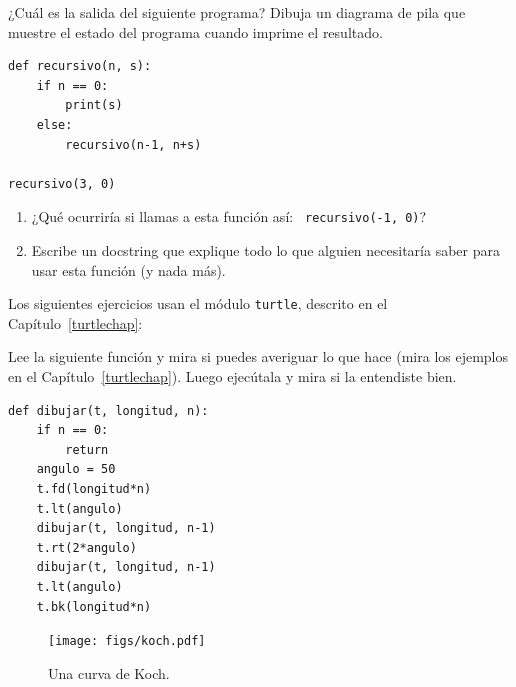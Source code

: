 \documentclass[10pt]{book}
\begin{document}
\begin{exercise}
¿Cuál es la salida del siguiente programa?
Dibuja un diagrama de pila que muestre el estado del programa
cuando imprime el resultado.

\begin{verbatim}
def recursivo(n, s):
    if n == 0:
        print(s)
    else:
        recursivo(n-1, n+s)

recursivo(3, 0)
\end{verbatim}

\begin{enumerate}

\item ¿Qué ocurriría si llamas a esta función así: {\tt
  recursivo(-1, 0)}?

\item Escribe un docstring que explique todo lo que alguien necesitaría
  saber para usar esta función (y nada más).

\end{enumerate}

\end{exercise}


Los siguientes ejercicios usan el módulo {\tt turtle}, descrito en el
Capítulo~\ref{turtlechap}:

\begin{exercise}

Lee la siguiente función y mira si puedes averiguar
lo que hace (mira los ejemplos en el Capítulo~\ref{turtlechap}).  Luego ejecútala
y mira si la entendiste bien.

\begin{verbatim}
def dibujar(t, longitud, n):
    if n == 0:
        return
    angulo = 50
    t.fd(longitud*n)
    t.lt(angulo)
    dibujar(t, longitud, n-1)
    t.rt(2*angulo)
    dibujar(t, longitud, n-1)
    t.lt(angulo)
    t.bk(longitud*n)
\end{verbatim}

\end{exercise}


\begin{figure}
\centerline
{\texttt{[image: figs/koch.pdf]}}
\caption{Una curva de Koch.}
\label{fig.koch}
\end{figure}
\end{document}
